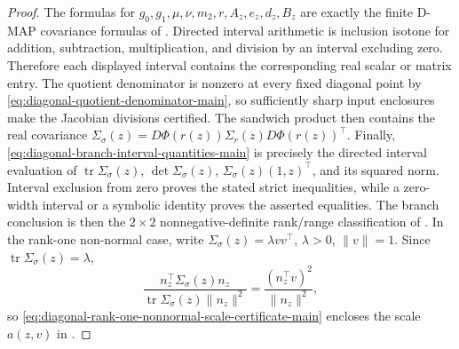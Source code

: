 \begin{proof}
The formulas for \(g_0,g_1,\mu,\nu,m_2,r,A_z,e_z,d_z,B_z\) are exactly the
finite D-MAP covariance formulas of
.  Directed interval arithmetic
is inclusion isotone for addition, subtraction, multiplication, and division
by an interval excluding zero.  Therefore each displayed interval contains the
corresponding real scalar or matrix entry.  The quotient denominator is
nonzero at every fixed diagonal point by
\eqref{eq:diagonal-quotient-denominator-main}, so sufficiently sharp input
enclosures make the Jacobian divisions certified.  The sandwich product then
contains the real covariance
\(\Sigma_\sigma(z)=D\Phi(r(z))\Sigma_r(z)D\Phi(r(z))^\top\).  Finally,
\eqref{eq:diagonal-branch-interval-quantities-main} is precisely the directed
interval evaluation of
\(\operatorname{tr}\Sigma_\sigma(z)\), \(\det\Sigma_\sigma(z)\),
\(\Sigma_\sigma(z)(1,z)^\top\), and its squared norm.  Interval exclusion from
zero proves the stated strict inequalities, while a zero-width interval or a
symbolic identity proves the asserted equalities.  The branch conclusion is
then the \(2\times2\) nonnegative-definite rank/range classification of
.  In the rank-one
non-normal case, write
\(\Sigma_\sigma(z)=\lambda vv^\top\), \(\lambda>0\), \(\|v\|=1\).  Since
\(\operatorname{tr}\Sigma_\sigma(z)=\lambda\),
\[
\frac{n_z^\top\Sigma_\sigma(z)n_z}
{\operatorname{tr}\Sigma_\sigma(z)\|n_z\|^2}
=\frac{(n_z^\top v)^2}{\|n_z\|^2},
\]
so \eqref{eq:diagonal-rank-one-nonnormal-scale-certificate-main} encloses the
scale \(a(z,v)\) in
.
\end{proof}

